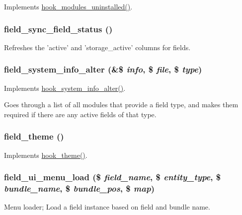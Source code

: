 \label{group__field_gacc7e883a1a3d5103fe4284be28547450}
Implements \hyperlink{group__hooks_ga4f29c7343438068a922459cbe0810279}{hook\_\-modules\_\-uninstalled()}. \hypertarget{group__field_ga8b6774c994bfbdd751d0e0aa83facfce}{
\subsubsection[{field\_\-sync\_\-field\_\-status}]{\setlength{\rightskip}{0pt plus 5cm}field\_\-sync\_\-field\_\-status ()}}
\label{group__field_ga8b6774c994bfbdd751d0e0aa83facfce}
Refreshes the 'active' and 'storage\_\-active' columns for fields. \hypertarget{group__field_ga5b151da09ab45e0f72989bc7bb6acc79}{
\subsubsection[{field\_\-system\_\-info\_\-alter}]{\setlength{\rightskip}{0pt plus 5cm}field\_\-system\_\-info\_\-alter (\&\$ {\em info}, \/  \$ {\em file}, \/  \$ {\em type})}}
\label{group__field_ga5b151da09ab45e0f72989bc7bb6acc79}
Implements \hyperlink{group__hooks_ga7dd7f887131916d5bbbb02ae87a9113e}{hook\_\-system\_\-info\_\-alter()}.

Goes through a list of all modules that provide a field type, and makes them required if there are any active fields of that type. \hypertarget{group__field_ga1babb2e6f8b678938c3834f2df5240d4}{
\subsubsection[{field\_\-theme}]{\setlength{\rightskip}{0pt plus 5cm}field\_\-theme ()}}
\label{group__field_ga1babb2e6f8b678938c3834f2df5240d4}
Implements \hyperlink{group__hooks_ga013ccb45c7aaab1c16cf9691428c910d}{hook\_\-theme()}. \hypertarget{group__field_gac2e5ac493328c146f17164168de40492}{
\subsubsection[{field\_\-ui\_\-menu\_\-load}]{\setlength{\rightskip}{0pt plus 5cm}field\_\-ui\_\-menu\_\-load (\$ {\em field\_\-name}, \/  \$ {\em entity\_\-type}, \/  \$ {\em bundle\_\-name}, \/  \$ {\em bundle\_\-pos}, \/  \$ {\em map})}}
\label{group__field_gac2e5ac493328c146f17164168de40492}
Menu loader; Load a field instance based on field and bundle name.



